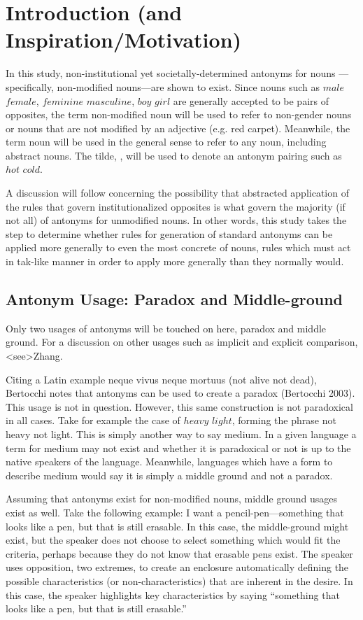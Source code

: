\section {Introduction (and Inspiration/Motivation)}
In this study, non-institutional yet societally-determined antonyms for nouns —specifically, non-modified nouns—are shown to exist.  Since nouns such as $male$ \opp $female$, $feminine$ \opp $masculine$, $boy$ \opp $girl$ are generally accepted to be pairs of opposites, the term non-modified noun will be used to refer to non-gender nouns or nouns that are not modified by an adjective (e.g. red carpet).  Meanwhile, the term noun will be used in the general sense to refer to any noun, including abstract nouns.  The tilde, \oppnospace, will be used to denote an antonym pairing such as $hot$ \opp $cold$.  

A discussion will follow concerning the possibility that abstracted application of the rules that govern institutionalized opposites is what govern the majority (if not all) of antonyms for unmodified nouns.  In other words, this study takes the step to determine whether rules for generation of standard antonyms can be applied more generally to even the most concrete of nouns, rules which must act in tak-like manner in order to apply more generally than they normally would.

\subsection {Antonym Usage: Paradox and Middle-ground} Only two usages of antonyms will be touched on here, paradox and middle ground.  For a discussion on other usages such as implicit and explicit comparison, \citeA<see>{Zhang}.  

Citing a Latin example neque vivus neque mortuus (not alive not dead), Bertocchi notes that antonyms can be used to create a paradox (Bertocchi 2003).  This usage is not in question.  However, this same construction is not paradoxical in all cases.  Take for example the case of $heavy$ \opp $light$, forming the phrase not heavy not light.  This is simply another way to say medium.  In a given language a term for medium may not exist and whether it is paradoxical or not is up to the native speakers of the language.  Meanwhile, languages which have a form to describe medium would say it is simply a middle ground and not a paradox. 

Assuming that antonyms exist for non-modified nouns, middle ground usages exist as well.  Take the following example: I want a pencil-pen—something that looks like a pen, but that is still erasable.  In this case, the middle-ground might exist, but the speaker does not choose to select something which would fit the criteria, perhaps because they do not know that erasable pens exist.  The speaker uses opposition, two extremes, to create an enclosure automatically defining the possible characteristics (or non-characteristics) that are inherent in the desire.  In this case, the speaker highlights key characteristics by saying “something that looks like a pen, but that is still erasable.”

